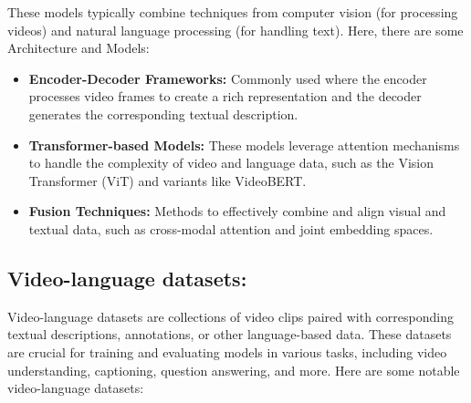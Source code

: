 \noindent These models typically combine techniques from computer vision (for processing videos) and natural language processing (for handling text). Here, there are some Architecture and Models:

\begin{itemize}
\item \textbf{Encoder-Decoder Frameworks:} Commonly used where the encoder processes video frames to create a rich representation and the decoder generates the corresponding textual description.
\item \textbf{Transformer-based Models:} These models leverage attention mechanisms to handle the complexity of video and language data, such as the Vision Transformer (ViT) and variants like VideoBERT.
\item \textbf{Fusion Techniques:} Methods to effectively combine and align visual and textual data, such as cross-modal attention and joint embedding spaces.
\end{itemize}
\subsection{Video-language datasets:}
Video-language datasets are collections of video clips paired with corresponding textual descriptions, annotations, or other language-based data. These datasets are crucial for training and evaluating models in various tasks, including video understanding, captioning, question answering, and more. Here are some notable video-language datasets:

